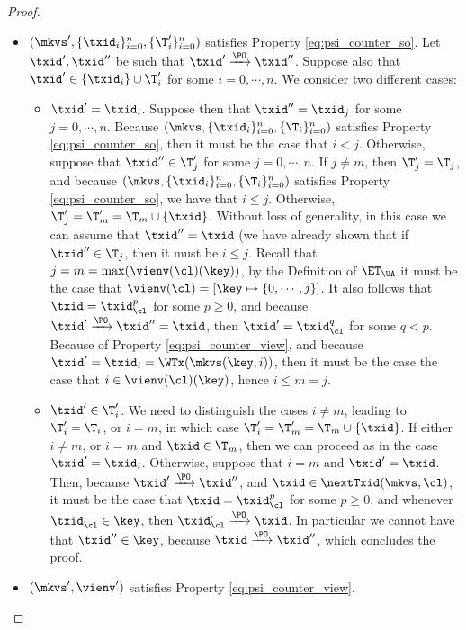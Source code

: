 \begin{proof}
\begin{itemize}
\begin{itemize}
\item $(\mkvs',  \{\txid_{i}\}_{i=0}^{n}, \{\T'_{i}\}_{i=0}^{n})$ satisfies Property \eqref{eq:psi_counter_so}. 
Let $\txid', \txid''$ be such that $\txid' \xrightarrow{\PO} \txid''$. 
Suppose also that $\txid' \in \{\txid_{i}\} \cup \T'_{i}$ for some $i = 0,\cdots, n$. We consider two different cases:
\begin{itemize}
\item $\txid' = \txid_{i}$. Suppose then that $\txid'' = \txid_{j}$ for some $j = 0, \cdots, n$. Because 
$(\mkvs,  \{\txid_{i}\}_{i=0}^{n}, \{\T_{i}\}_{i=0}^{n})$ satisfies Property 
\eqref{eq:psi_counter_so}, then it must be the case that $i < j$. Otherwise, 
suppose that $\txid'' \in \T'_{j}$ for some $j=0,\cdots,n$. If $j \neq m$, then $\T'_{j} = \T_{j}$, 
and because $(\mkvs,  \{\txid_{i}\}_{i=0}^{n}, \{\T_{i}\}_{i=0}^{n})$ satisfies Property \eqref{eq:psi_counter_so}, we have that $i \leq j$. 
Otherwise, $\T'_{j} = \T'_{m} =  \T_{m} \cup \{\txid\}$. Without loss of generality, in this case 
we can assume that $\txid'' = \txid$ (we have already shown that if $\txid'' \in \T_{j}$, then 
it must be $i \leq j$. Recall that $j = m = \max(\vienv(\cl)(\key))$, by the Definition of 
$\ET_{\UA}$ it must be the case that $\vienv(\cl) = [\key \mapsto \{0,\cdots, j\}]$. 
It also follows that $\txid = \txid_{\cl}^{p}$ for some $p \geq 0$, and because $\txid' \xrightarrow{\PO} \txid'' = \txid$, 
then $\txid' = \txid_{\cl}^{q}$ for some $q < p$. Because of Property 
\eqref{eq:psi_counter_view}, and because $\txid' = \txid_{i} = \WTx(\mkvs(\key, i))$, then it must be the case the 
case that $i \in \vienv(\cl)(\key)$, hence  $i \leq m = j$.

\item $\txid' \in \T'_{i}$. We need to distinguish the cases $i \neq m$, leading to $\T'_{i} = \T_{i}$, 
or $i = m$, in which case $\T'_{i} = \T'_{m} = \T_{m} \cup \{\txid\}$. If either $i \neq m$, or $i = m$ and $\txid \in 
\T_{m}$, then we can proceed as in the case $\txid' = \txid_{i}$. Otherwise, suppose that $i = m$ and 
$\txid' = \txid$. Then, because $\txid' \xrightarrow{\PO} \txid''$, and $\txid \in \nextTxid(\mkvs,\cl)$, 
it must be the case that $\txid = \txid_{\cl}^{p}$ for some $p \geq 0$, and whenever 
$\txid_{\cl}^{\cdot} \in \key$, then $\txid_{\cl}^{\cdot} \xrightarrow{\PO} \txid$. In particular 
we cannot have that $\txid'' \in \key$, because $\txid \xrightarrow{\PO} \txid''$, which 
concludes the proof.
\end{itemize}

\item $(\mkvs', \vienv')$ satisfies Property \eqref{eq:psi_counter_view}.

\end{itemize}

\end{itemize}

\end{proof}

